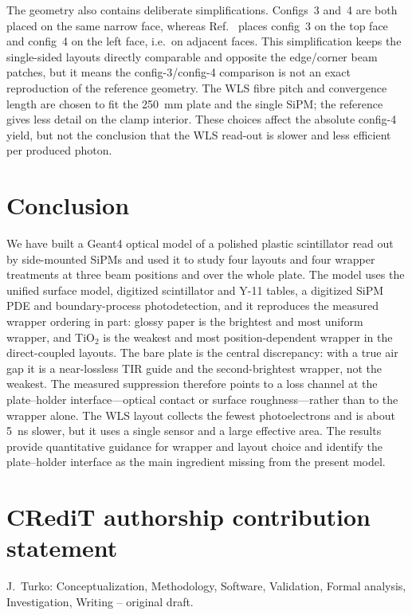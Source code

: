 \documentclass[preprint,12pt]{elsarticle}
\newcommand{\gfour}{Geant4}
\begin{document}
The geometry also contains deliberate simplifications. Configs~3 and~4 are both
placed on the same narrow face, whereas Ref.~\cite{Rao2025} places config~3 on
the top face and config~4 on the left face, i.e.\ on adjacent faces. This
simplification keeps the single-sided layouts directly comparable and opposite
the edge/corner beam patches, but it means the config-3/config-4 comparison is
not an exact reproduction of the reference geometry. The WLS fibre pitch and
convergence length are chosen to fit the \SI{250}{\milli\meter} plate and the
single SiPM; the reference gives less detail on the clamp interior. These choices
affect the absolute config-4 yield, but not the conclusion that the WLS read-out
is slower and less efficient per produced photon.

\section{Conclusion}
\label{sec:conclusion}

We have built a \gfour{} optical model of a polished plastic scintillator read
out by side-mounted SiPMs and used it to study four layouts and four wrapper
treatments at three beam positions and over the whole plate. The model uses the
unified surface model, digitized scintillator and Y-11 tables, a digitized SiPM
PDE and boundary-process photodetection, and it reproduces the measured wrapper
ordering in part: glossy paper is the brightest and most uniform wrapper, and
TiO$_2$ is the weakest and most position-dependent wrapper in the direct-coupled
layouts. The bare plate is the central discrepancy: with a true air gap it is a
near-lossless TIR guide and the second-brightest wrapper, not the weakest. The
measured suppression therefore points to a loss channel at the plate--holder
interface---optical contact or surface roughness---rather than to the wrapper
alone. The WLS layout collects the fewest photoelectrons and is about
\SI{5}{\nano\second} slower, but it uses a single sensor and a large effective
area. The results provide quantitative guidance for wrapper and layout choice
and identify the plate--holder interface as the main ingredient missing from the
present model.

\section*{CRediT authorship contribution statement}
J.~Turko: Conceptualization, Methodology, Software, Validation, Formal analysis,
Investigation, Writing -- original draft.
\end{document}
